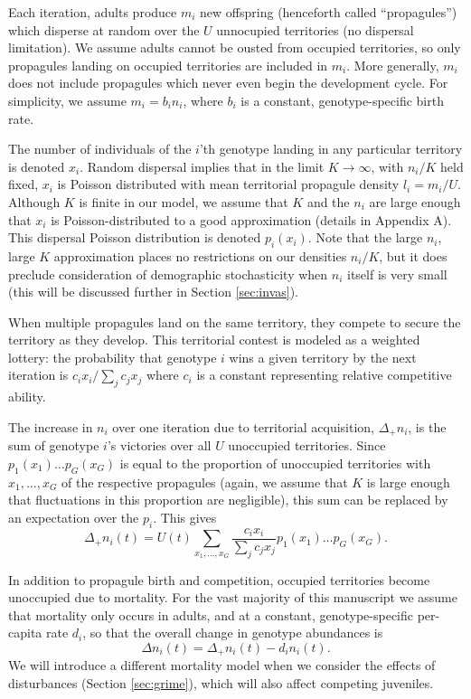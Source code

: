 \documentclass[11pt]{article}
\begin{document}
Each iteration, adults produce $m_i$ new offspring (henceforth called ``propagules'') which disperse at random over the $U$ unnocupied territories (no dispersal limitation). We assume adults cannot be ousted from occupied territories, so only propagules landing on occupied territories are included in $m_i$. More generally, $m_i$ does not include propagules which never even begin the development cycle. For simplicity, we assume $m_i=b_i n_i$, where $b_i$ is a constant, genotype-specific birth rate. 

The number of individuals of the $i$'th genotype landing in any particular territory is denoted $x_i$. Random dispersal implies that in the limit $K\rightarrow \infty$, with $n_i/K$ held fixed, $x_i$ is Poisson distributed with mean territorial propagule density $l_i=m_i/U$. Although $K$ is finite in our model, we assume that $K$ and the $n_i$ are large enough that $x_i$ is Poisson-distributed to a good approximation (details in Appendix A). This dispersal Poisson distribution is denoted $p_i(x_i)$. Note that the large $n_i$, large $K$ approximation places no restrictions on our densities $n_i/K$, but it does preclude consideration of demographic stochasticity when $n_i$ itself is very small (this will be discussed further in Section \ref{sec:invas}).

When multiple propagules land on the same territory, they compete to secure the territory as they develop. This territorial contest is modeled as a weighted lottery: the probability that genotype $i$ wins a given territory by the next iteration is $c_i x_i/\sum_j c_j x_j$ where $c_i$ is a constant representing relative competitive ability. 

The increase in $n_i$ over one iteration due to territorial acquisition, $\Delta_+ n_i$, is the sum of genotype $i$'s victories over all $U$ unoccupied territories. Since $p_1(x_1)\ldots p_G(x_G)$ is equal to the proportion of unoccupied territories with $x_1,\ldots,x_G$ of the respective propagules (again, we assume that $K$ is large enough that fluctuations in this proportion are negligible), this sum can be replaced by an expectation over the $p_i$. This gives
\begin{equation}
\Delta_+ n_i(t)=U(t)\sum_{x_1,\ldots,x_G} \frac{c_i x_i}{\sum_j c_j x_j} p_1(x_1)\ldots p_G(x_G). \label{eq:growthsumuncoupled}
\end{equation}

In addition to propagule birth and competition, occupied territories become unoccupied due to mortality. For the vast majority of this manuscript we assume that mortality only occurs in adults, and at a constant, genotype-specific per-capita rate $d_i$, so that the overall change in genotype abundances is
\begin{equation}
\Delta n_i(t)=\Delta_+ n_i(t)-d_i n_i(t). \label{eq:delttot}
\end{equation}
We will introduce a different mortality model when we consider the effects of disturbances (Section \ref{sec:grime}), which will also affect competing juveniles. 
\end{document}
